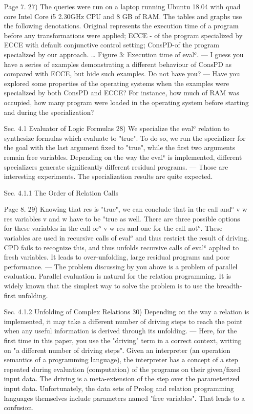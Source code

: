 Page 7.
27) The queries were run on a laptop running Ubuntu 18.04 with quad core Intel Core i5 2.30GHz CPU and 8 GB of RAM. The tables and graphs use the following denotations. Original represents the execution time of a program before any transformations were applied; ECCE - of the program specialized by ECCE with default conjunctive control setting; ConsPD-of the program specialized by our approach. … Figure 3: Execution time of eval$^o$.
 --- I guess you have a series of examples demonstrating a different behaviour of ConsPD as compared with ECCE, but hide such examples. Do not have you?
 --- Have you explored some properties of the operating systems when the examples were specialized by both ConsPD and ECCE? For instance, how much of RAM was occupied, how many program were loaded in the operating system before starting and during the specialization?

Sec. 4.1 Evaluator of Logic Formulas
28) We specialize the eval$^o$ relation to synthesize formulas which evaluate to "true". To do so, we run the specializer for the goal with the last argument fixed to "true", while the first two arguments remain free variables. Depending on the way the eval$^o$ is implemented, different specializers generate significantly different residual programs.
 --- Those are interesting experiments. The specialization results are quite expected.

Sec. 4.1.1 The Order of Relation Calls

Page 8.
29) Knowing that res is "true", we can conclude that in the call and$^o$ v w res variables v and w have to be "true as well. There are three possible options for these variables in the call or$^o$ v w res and one for the call not$^o$. These variables are used in recursive calls of eval$^o$ and thus restrict the result of driving. CPD fails to recognize this, and thus unfolds recursive calls of eval$^o$ applied to fresh variables. It leads to over-unfolding, large residual programs and poor performance.
 --- The problem discussing by you above is a problem of parallel evaluation. Parallel evaluation is natural for the relation programming. It is widely known that the simplest way to solve the problem is to use the breadth-first unfolding.

Sec. 4.1.2 Unfolding of Complex Relations
30) Depending on the way a relation is implemented, it may take a different number of driving steps to reach the point when any useful information is derived through its unfolding.
 --- Here, for the first time in this paper, you use the "driving" term in a correct context, writing on "a different number of driving steps". Given an interpreter (an operation semantics of a programming language), the interpreter has a concept of a step repeated during evaluation (computation) of the programs on their given/fixed input data. The driving is a meta-extension of the step over the parameterized input data. Unfortunately, the data sets of Prolog and relation programming languages themselves include parameters named "free variables". That leads to a confusion.

